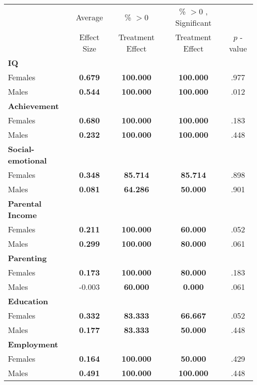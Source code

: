 \begin{tabular}{l c c c c}
\toprule
 & Average & \% $ >0 $ & \% $ >0 $ , Significant & \citet{Rosenbaum_2005_Distribution_JRSS} \\
 & Effect Size & Treatment Effect & Treatment Effect & $ p $ -value \\
\midrule
\textbf{IQ} & & & & \\
\quad Females &  \textbf{    0.679} & \textbf{  100.000} & \textbf{  100.000} & .977 \\
\quad Males &  \textbf{    0.544} & \textbf{  100.000} & \textbf{  100.000} & .012 \\
\midrule
\textbf{Achievement} & & & & \\
\quad Females &  \textbf{    0.680} & \textbf{  100.000} & \textbf{  100.000} & .183 \\
\quad Males &  \textbf{    0.232} & \textbf{  100.000} & \textbf{  100.000} & .448 \\
\midrule
\textbf{Social-emotional} & & & & \\
\quad Females &  \textbf{    0.348} & \textbf{   85.714} & \textbf{   85.714} & .898 \\
\quad Males &  \textbf{    0.081} & \textbf{   64.286} & \textbf{   50.000} & .901 \\
\midrule
\textbf{Parental Income} & & & & \\
\quad Females &  \textbf{    0.211} & \textbf{  100.000} & \textbf{   60.000} & .052 \\
\quad Males &  \textbf{    0.299} & \textbf{  100.000} & \textbf{   80.000} & .061 \\
\midrule
\textbf{Parenting} & & & & \\
\quad Females &  \textbf{    0.173} & \textbf{  100.000} & \textbf{   80.000} & .183 \\
\quad Males &     -0.003 & \textbf{   60.000} & \textbf{    0.000} & .061 \\
\midrule
\textbf{Education} & & & & \\
\quad Females &  \textbf{    0.332} & \textbf{   83.333} & \textbf{   66.667} & .052 \\
\quad Males &  \textbf{    0.177} & \textbf{   83.333} & \textbf{   50.000} & .448 \\
\midrule
\textbf{Employment} & & & & \\
\quad Females &  \textbf{    0.164} & \textbf{  100.000} & \textbf{   50.000} & .429 \\
\quad Males &  \textbf{    0.491} & \textbf{  100.000} & \textbf{  100.000} & .448 \\

\end{tabular}
